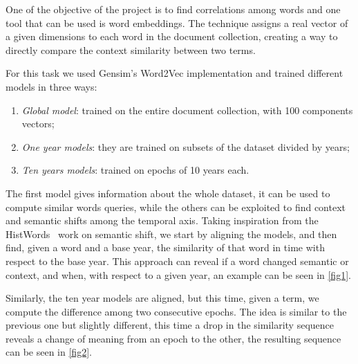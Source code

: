 One of the objective of the project is to find correlations among words and one tool 
that can be used is word embeddings. The technique assigns a real vector of a given dimensions
to each word in the document collection, creating a way to directly compare the context 
similarity between two terms.

For this task we used Gensim's Word2Vec implementation and trained different models 
in three ways:
\begin{enumerate}
    \item \emph{Global model}: trained on the entire document collection, with 100 components vectors;
    \item \emph{One year models}: they are trained on subsets of the dataset divided by years;
    \item \emph{Ten years models}: trained on epochs of 10 years each.
\end{enumerate}
The first model gives information about the whole dataset, it can be used to compute 
similar words queries, while the others can be exploited to find context and semantic shifts 
among the temporal axis.
Taking inspiration from the HistWords~\cite{hist-words} work on semantic shift, we start by aligning the models, 
and then find, given a word and a base year, the similarity of that word in time with respect 
to the base year. This approach can reveal if a word changed semantic or context, and when, 
with respect to a given year, an example can be seen in \vref{fig1}. 

Similarly, the ten year models are aligned, but this time, given a term, we compute the 
difference among two consecutive epochs. The idea is similar to the previous one but slightly 
different, this time a drop in the similarity sequence 
reveals a change of meaning from an epoch to the other, the resulting 
sequence can be seen in \vref{fig2}.

